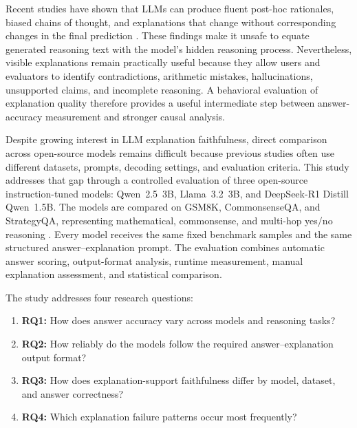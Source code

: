 \documentclass{article}
\begin{document}
Recent studies have shown that LLMs can produce fluent post-hoc
rationales, biased chains of thought, and explanations that change
without corresponding changes in the final prediction
\cite{madsen2024selfexplanations,paul2024making,matton2025walk,zaman2025causal}.
These findings make it unsafe to equate generated reasoning text with
the model's hidden reasoning process. Nevertheless, visible
explanations remain practically useful because they allow users and
evaluators to identify contradictions, arithmetic mistakes,
hallucinations, unsupported claims, and incomplete reasoning. A
behavioral evaluation of explanation quality therefore provides a
useful intermediate step between answer-accuracy measurement and
stronger causal analysis.

Despite growing interest in LLM explanation faithfulness, direct
comparison across open-source models remains difficult because previous
studies often use different datasets, prompts, decoding settings, and
evaluation criteria. This study addresses that gap through a controlled
evaluation of three open-source instruction-tuned models:
Qwen~2.5~3B, Llama~3.2~3B, and DeepSeek-R1 Distill Qwen~1.5B.
The models are compared on GSM8K, CommonsenseQA, and StrategyQA,
representing mathematical, commonsense, and multi-hop yes/no reasoning
\cite{cobbe2021gsm8k,talmor2019commonsenseqa,geva2021strategyqa}.
Every model receives the same fixed benchmark samples and the same
structured answer--explanation prompt. The evaluation combines
automatic answer scoring, output-format analysis, runtime measurement,
manual explanation assessment, and statistical comparison.

The study addresses four research questions:

\begin{enumerate}
    \item \textbf{RQ1:} How does answer accuracy vary across models and
    reasoning tasks?

    \item \textbf{RQ2:} How reliably do the models follow the required
    answer--explanation output format?

    \item \textbf{RQ3:} How does explanation-support faithfulness differ
    by model, dataset, and answer correctness?

    \item \textbf{RQ4:} Which explanation failure patterns occur most
    frequently?
\end{enumerate}
\end{document}
